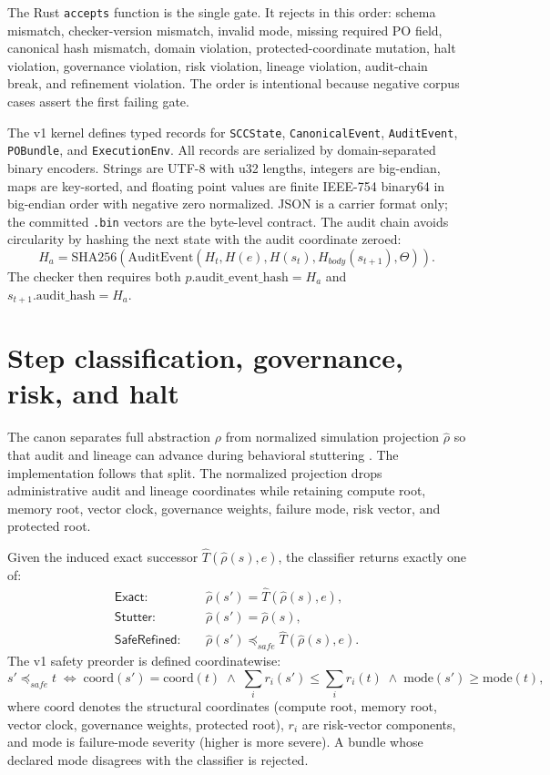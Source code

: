 \documentclass{article}
\newcommand{\Exact}{\ensuremath{\mathsf{Exact}}}
\newcommand{\Stutter}{\ensuremath{\mathsf{Stutter}}}
\newcommand{\SafeRefined}{\ensuremath{\mathsf{SafeRefined}}}
\begin{document}
The Rust \texttt{accepts} function is the single gate. It rejects in this order: schema mismatch, checker-version mismatch, invalid mode, missing required PO field, canonical hash mismatch, domain violation, protected-coordinate mutation, halt violation, governance violation, risk violation, lineage violation, audit-chain break, and refinement violation. The order is intentional because negative corpus cases assert the first failing gate.

The v1 kernel defines typed records for \texttt{SCCState}, \texttt{CanonicalEvent}, \texttt{AuditEvent}, \texttt{POBundle}, and \texttt{ExecutionEnv}. All records are serialized by domain-separated binary encoders. Strings are UTF-8 with u32 lengths, integers are big-endian, maps are key-sorted, and floating point values are finite IEEE-754 binary64 in big-endian order with negative zero normalized. JSON is a carrier format only; the committed \texttt{.bin} vectors are the byte-level contract. The audit chain avoids circularity by hashing the next state with the audit coordinate zeroed:
\begin{equation}
H_a = \mathrm{SHA256}(\mathrm{AuditEvent}(H_t,H(e),H(s_t),H_{body}(s_{t+1}),\Theta)).
\end{equation}
The checker then requires both $p.\mathrm{audit\_event\_hash}=H_a$ and $s_{t+1}.\mathrm{audit\_hash}=H_a$.

\section{Step classification, governance, risk, and halt}
The canon separates full abstraction $\rho$ from normalized simulation projection $\widehat{\rho}$ so that audit and lineage can advance during behavioral stuttering \citep{scc-canon}. The implementation follows that split. The normalized projection drops administrative audit and lineage coordinates while retaining compute root, memory root, vector clock, governance weights, failure mode, risk vector, and protected root.

Given the induced exact successor $\widehat{T}(\widehat{\rho}(s),e)$, the classifier returns exactly one of:
\begin{align}
\Exact:&\quad \widehat{\rho}(s') = \widehat{T}(\widehat{\rho}(s),e),\\
\Stutter:&\quad \widehat{\rho}(s') = \widehat{\rho}(s),\\
\SafeRefined:&\quad \widehat{\rho}(s') \preceq_{safe} \widehat{T}(\widehat{\rho}(s),e).
\end{align}
The v1 safety preorder is defined coordinatewise:
\begin{equation}
  s' \preceq_{safe} t \;\iff\;
  \mathrm{coord}(s') = \mathrm{coord}(t)
  \;\wedge\; \textstyle\sum_i r_i(s') \leq \textstyle\sum_i r_i(t)
  \;\wedge\; \mathrm{mode}(s') \geq \mathrm{mode}(t),
\end{equation}
where $\mathrm{coord}$ denotes the structural coordinates (compute root, memory root, vector clock, governance weights, protected root), $r_i$ are risk-vector components, and $\mathrm{mode}$ is failure-mode severity (higher is more severe). A bundle whose declared mode disagrees with the classifier is rejected.
\end{document}
